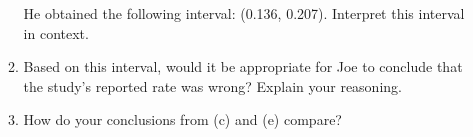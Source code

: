 \documentclass[
  letterpaper,
  DIV=11,
  numbers=noendperiod]{scrartcl}
\begin{document}
\begin{enumerate}
\begin{enumerate}
    He obtained the following interval: (0.136, 0.207). Interpret this
    interval in context.
  \item
    Based on this interval, would it be appropriate for Joe to conclude
    that the study's reported rate was wrong? Explain your reasoning.
  \item
    How do your conclusions from (c) and (e) compare?
  \end{enumerate}
\end{enumerate}
\end{document}
